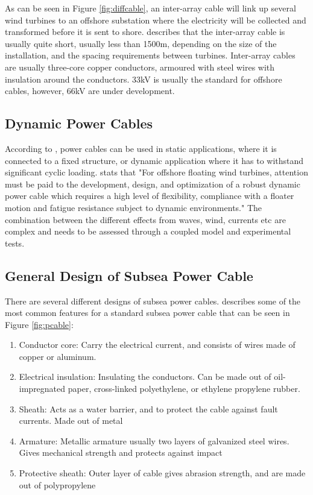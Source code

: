 \noindent As can be seen in Figure \ref{fig:diffcable}, an inter-array cable will link up several wind turbines to an offshore substation where the electricity will be collected and transformed before it is sent to shore. \cite{srinil2016} describes that the inter-array cable is usually quite short, usually less than 1500m, depending on the size of the installation, and the spacing requirements between turbines. Inter-array cables are usually three-core copper conductors, armoured with steel wires with insulation around the conductors. 33kV is usually the standard for offshore cables, however, 66kV are under development. \newline
\newline
  
  \subsection{Dynamic Power Cables}
According to \cite{Thies2012}, power cables can be used in static applications, where it is connected to a fixed structure, or dynamic application where it has to withstand significant cyclic loading. \cite{srinil2016} stats that "For offshore floating wind turbines, attention must be paid to the development, design, and optimization of a robust dynamic power cable which requires a high level of flexibility, compliance with a floater motion and fatigue resistance subject to dynamic environments." The combination between the different effects from waves, wind, currents etc are complex and needs to be assessed through a coupled model and experimental tests. 

\subsection{General Design of Subsea Power Cable}
There are several different designs of subsea power cables. \cite{Thies2012} describes some of the most common features for a standard subsea power cable that can be seen in Figure \ref{fig:pcable}: 

\begin{enumerate}[label=\Alph*]
\item Conductor core: Carry the electrical current, and consists of wires made of copper or aluminum. 
\item Electrical insulation: Insulating the conductors. Can be made out of oil-impregnated paper, cross-linked polyethylene, or ethylene propylene rubber.
\item Sheath: Acts as a water barrier, and to protect the cable against fault currents. Made out of metal
\item Armature: Metallic armature usually two layers of galvanized steel wires. Gives mechanical strength and protects against impact
\item Protective sheath: Outer layer of cable gives abrasion strength, and are made out of polypropylene
\end{enumerate}

